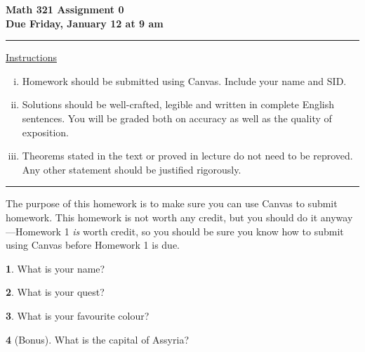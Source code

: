 \documentclass[12pt]{article}
\theoremstyle{definition}
\newtheorem{problem}{}
\begin{document}
\fancyhf{} %
\renewcommand{\headrulewidth}{0pt}


\begin{center} 
{\bf{Math 321 Assignment 0}} \\ 
{\bf{Due Friday, January 12 at 9 am}} 
\end{center}  
\bigskip
\hrule
\begin{center}
{\underline{Instructions}} 
\end{center} 
\begin{enumerate}[(i)] 
\item Homework should be submitted using Canvas. Include your name and SID.
%
\item Solutions should be well-crafted, legible and written in complete English sentences. You will be graded both on accuracy as well as the quality of exposition.
%
\item Theorems stated in the text or proved in lecture do not need to be reproved. Any other statement should be justified rigorously.
% 
\end{enumerate} 
\hrule
\bigskip

The purpose of this homework is to make sure you can use Canvas to submit homework. This homework is not worth any credit, but you should do it anyway---Homework 1 \emph{is} worth credit, so you should be sure you know how to submit using Canvas before Homework 1 is due. 

\begin{problem}
What is your name?
\end{problem}

\begin{problem}
What is your quest?
\end{problem}

\begin{problem}
What is your favourite colour?
\end{problem}

\begin{problem}
[Bonus] What is the capital of Assyria?
\end{problem}
\end{document}
